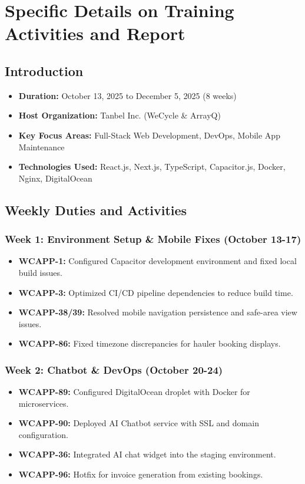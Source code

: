 \chapter{Specific Details on Training Activities and Report}
\label{chapter-3}

\section{Introduction}
\begin{itemize}
    \item \textbf{Duration:} October 13, 2025 to December 5, 2025 (8 weeks)
    \item \textbf{Host Organization:} Tanbel Inc. (WeCycle & ArrayQ)
    \item \textbf{Key Focus Areas:} Full-Stack Web Development, DevOps, Mobile App Maintenance
    \item \textbf{Technologies Used:} React.js, Next.js, TypeScript, Capacitor.js, Docker, Nginx, DigitalOcean
\end{itemize}

\section{Weekly Duties and Activities}

\subsection{Week 1: Environment Setup \& Mobile Fixes (October 13-17)}
\begin{itemize}
    \item \textbf{WCAPP-1:} Configured Capacitor development environment and fixed local build issues.
    \item \textbf{WCAPP-3:} Optimized CI/CD pipeline dependencies to reduce build time.
    \item \textbf{WCAPP-38/39:} Resolved mobile navigation persistence and safe-area view issues.
    \item \textbf{WCAPP-86:} Fixed timezone discrepancies for hauler booking displays.
\end{itemize}

\subsection{Week 2: Chatbot \& DevOps (October 20-24)}
\begin{itemize}
    \item \textbf{WCAPP-89:} Configured DigitalOcean droplet with Docker for microservices.
    \item \textbf{WCAPP-90:} Deployed AI Chatbot service with SSL and domain configuration.
    \item \textbf{WCAPP-36:} Integrated AI chat widget into the staging environment.
    \item \textbf{WCAPP-96:} Hotfix for invoice generation from existing bookings.
\end{itemize}

